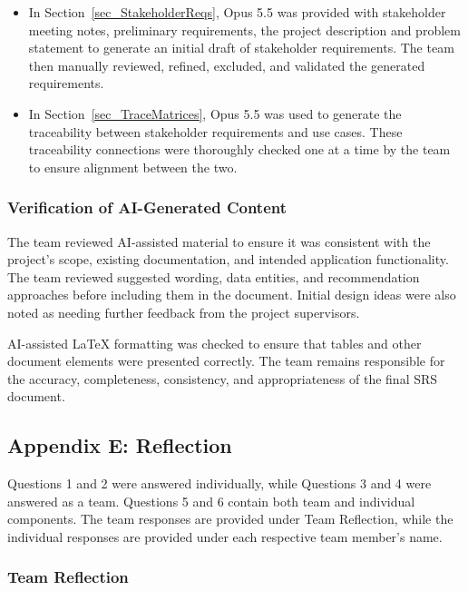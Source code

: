 \documentclass[10pt]{article}
\begin{document}
\begin{itemize}
    \item In Section~\ref{sec_StakeholderReqs}, Opus 5.5 was provided with stakeholder 
    meeting notes, preliminary requirements, the project description and problem statement 
    to generate an initial draft of stakeholder requirements. The team then manually reviewed, 
    refined, excluded, and validated the generated requirements.

    \item In Section~\ref{sec_TraceMatrices}, Opus 5.5 was used to generate the traceability 
    between stakeholder requirements and use cases. These traceability connections were thoroughly 
    checked one at a time by the team to ensure alignment between the two.

\end{itemize}

\subsubsection*{Verification of AI-Generated Content}

The team reviewed AI-assisted material to ensure it was
consistent with the project's scope, existing documentation,
and intended application functionality. The team reviewed suggested 
wording, data entities, and recommendation approaches before including 
them in the document. Initial design ideas were also noted as needing 
further feedback from the project supervisors.

AI-assisted \LaTeX{} formatting was checked to ensure
that tables and other document elements were presented
correctly. The team remains responsible for the accuracy,
completeness, consistency, and appropriateness of the
final SRS document.

\newpage
\subsection{Appendix E: Reflection}

Questions 1 and 2 were answered individually, while Questions 3 and 4 were
answered as a team. Questions 5 and 6 contain both team and individual
components. The team responses are provided under Team Reflection, while the
individual responses are provided under each respective team member's name.

\subsubsection*{Team Reflection}
\end{document}
